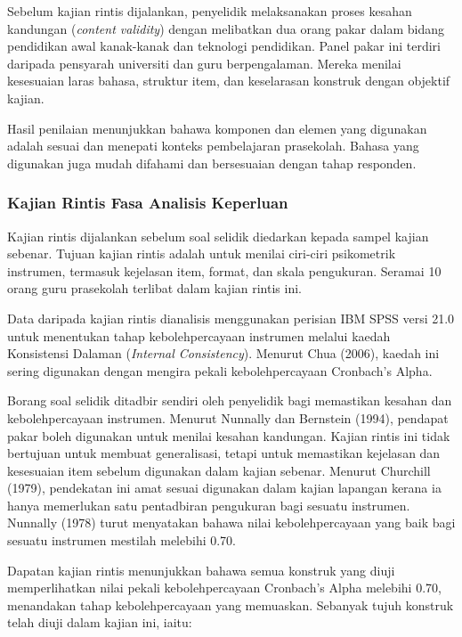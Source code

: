 \begin{itemize}
Sebelum kajian rintis dijalankan, penyelidik melaksanakan proses kesahan kandungan (\textit{content validity}) dengan melibatkan dua orang pakar dalam bidang pendidikan awal kanak-kanak dan teknologi pendidikan. Panel pakar ini terdiri daripada pensyarah universiti dan guru berpengalaman. Mereka menilai kesesuaian laras bahasa, struktur item, dan keselarasan konstruk dengan objektif kajian.

Hasil penilaian menunjukkan bahawa komponen dan elemen yang digunakan adalah sesuai dan menepati konteks pembelajaran prasekolah. Bahasa yang digunakan juga mudah difahami dan bersesuaian dengan tahap responden.

\subsubsection{Kajian Rintis Fasa Analisis Keperluan}

Kajian rintis dijalankan sebelum soal selidik diedarkan kepada sampel kajian sebenar. Tujuan kajian rintis adalah untuk menilai ciri-ciri psikometrik instrumen, termasuk kejelasan item, format, dan skala pengukuran. Seramai 10 orang guru prasekolah terlibat dalam kajian rintis ini.

Data daripada kajian rintis dianalisis menggunakan perisian IBM SPSS versi 21.0 untuk menentukan tahap kebolehpercayaan instrumen melalui kaedah Konsistensi Dalaman (\textit{Internal Consistency}). Menurut Chua (2006), kaedah ini sering digunakan dengan mengira pekali kebolehpercayaan Cronbach's Alpha.

Borang soal selidik ditadbir sendiri oleh penyelidik bagi memastikan kesahan dan kebolehpercayaan instrumen. Menurut Nunnally dan Bernstein (1994), pendapat pakar boleh digunakan untuk menilai kesahan kandungan. Kajian rintis ini tidak bertujuan untuk membuat generalisasi, tetapi untuk memastikan kejelasan dan kesesuaian item sebelum digunakan dalam kajian sebenar.
Menurut Churchill (1979), pendekatan ini amat sesuai digunakan dalam kajian lapangan kerana ia hanya memerlukan satu pentadbiran pengukuran bagi sesuatu instrumen. Nunnally (1978) turut menyatakan bahawa nilai kebolehpercayaan yang baik bagi sesuatu instrumen mestilah melebihi 0.70.

Dapatan kajian rintis menunjukkan bahawa semua konstruk yang diuji memperlihatkan nilai pekali kebolehpercayaan Cronbach's Alpha melebihi 0.70, menandakan tahap kebolehpercayaan yang memuaskan. Sebanyak tujuh konstruk telah diuji dalam kajian ini, iaitu:


\end{itemize}
